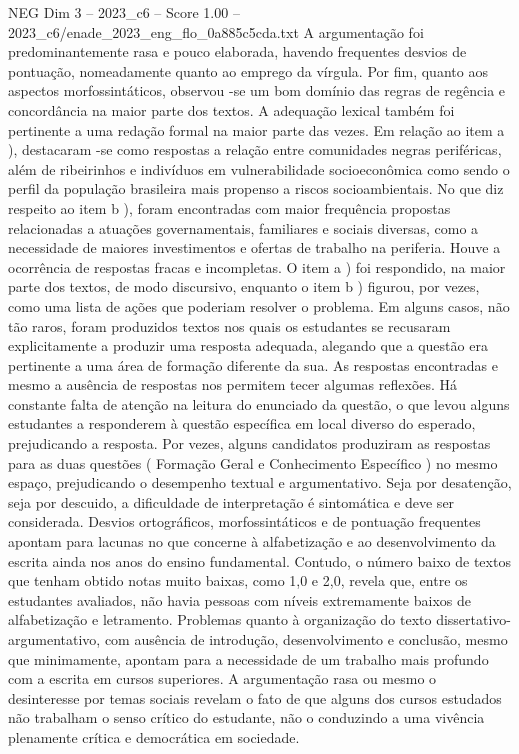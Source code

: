 \begin{textsample}{NEG Dim 3 – 2023\_c6 – Score 1.00 – 2023\_c6/enade\_2023\_eng\_flo\_0a885c5cda.txt}
A argumentação foi predominantemente rasa e pouco elaborada, havendo frequentes desvios de pontuação, nomeadamente quanto ao emprego da vírgula.
Por fim, quanto aos aspectos morfossintáticos, observou -se um bom domínio das regras de regência e concordância na maior parte dos textos.
A adequação lexical também foi pertinente a uma redação formal na maior parte das vezes.
Em relação ao item a ), destacaram -se como respostas a relação entre comunidades negras periféricas, além de ribeirinhos e indivíduos em vulnerabilidade socioeconômica como sendo o perfil da população brasileira mais propenso a riscos socioambientais.
No que diz respeito ao item b ), foram encontradas com maior frequência propostas relacionadas a atuações governamentais, familiares e sociais diversas, como a necessidade de maiores investimentos e ofertas de trabalho na periferia.
Houve a ocorrência de respostas fracas e incompletas.
O item a ) foi respondido, na maior parte dos textos, de modo discursivo, enquanto o item b ) figurou, por vezes, como uma lista de ações que poderiam resolver o problema.
Em alguns casos, não tão raros, foram produzidos textos nos quais os estudantes se recusaram explicitamente a produzir uma resposta adequada, alegando que a questão era pertinente a uma área de formação diferente da sua.
As respostas encontradas e mesmo a ausência de respostas nos permitem tecer algumas reflexões.
Há constante falta de atenção na leitura do enunciado da questão, o que levou alguns estudantes a responderem à questão específica em local diverso do esperado, prejudicando a resposta.
Por vezes, alguns candidatos produziram as respostas para as duas questões ( Formação Geral e Conhecimento Específico ) no mesmo espaço, prejudicando o desempenho textual e argumentativo.
Seja por desatenção, seja por descuido, a dificuldade de interpretação é sintomática e deve ser considerada.
Desvios ortográficos, morfossintáticos e de pontuação frequentes apontam para lacunas no que concerne à alfabetização e ao desenvolvimento da escrita ainda nos anos do ensino fundamental.
Contudo, o número baixo de textos que tenham obtido notas muito baixas, como 1,0 e 2,0, revela que, entre os estudantes avaliados, não havia pessoas com níveis extremamente baixos de alfabetização e letramento.
Problemas quanto à organização do texto dissertativo-argumentativo, com ausência de introdução, desenvolvimento e conclusão, mesmo que minimamente, apontam para a necessidade de um trabalho mais profundo com a escrita em cursos superiores.
A argumentação rasa ou mesmo o desinteresse por temas sociais revelam o fato de que alguns dos cursos estudados não trabalham o senso crítico do estudante, não o conduzindo a uma vivência plenamente crítica e democrática em sociedade.

\end{textsample}
